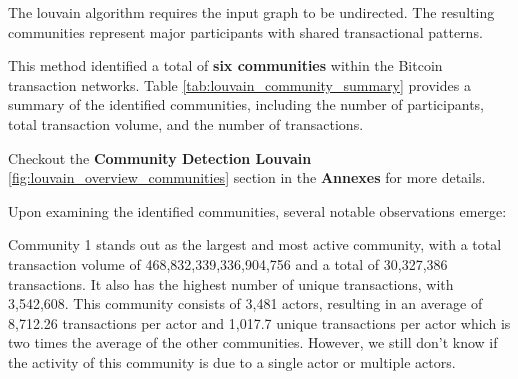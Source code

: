 \documentclass[a4paper, 12pt]{article}
\begin{document}
The louvain algorithm requires the input graph to be undirected. The resulting communities represent major participants with shared transactional patterns.

This method identified a total of \textbf{six communities} within the Bitcoin transaction networks. Table \ref{tab:louvain_community_summary} provides a summary of the identified communities, including the number of participants, total transaction volume, and the number of transactions.

\begin{table}[!htb]
    \centering
    \caption{Summary of Louvain Community Characteristics}
    \label{tab:louvain_community_summary}
\end{table}

Checkout the \textbf{Community Detection Louvain} \ref{fig:louvain_overview_communities} section in the \textbf{Annexes} for more details.


Upon examining the identified communities, several notable observations emerge:

Community 1 stands out as the largest and most active community, with a total transaction volume of 468,832,339,336,904,756 and a total of 30,327,386 transactions.
It also has the highest number of unique transactions, with 3,542,608. This community consists of 3,481 actors, resulting in an average of 8,712.26 transactions per actor and 1,017.7 unique transactions per actor which is two times the average of the other communities.
However, we still don't know if the activity of this community is due to a single actor or multiple actors.
\end{document}
